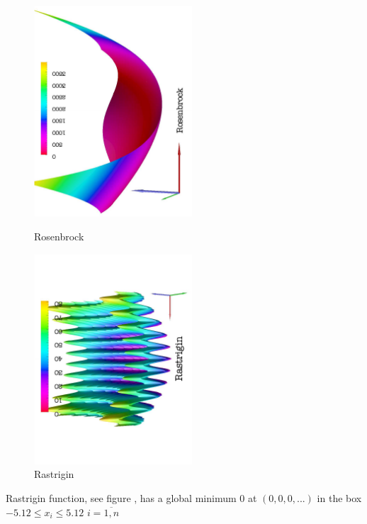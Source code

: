 \begin{figure}[!htb]
\begin{minipage}[!htb]{7.6cm}
\begin{center}
\includegraphics[width=5.9cm,angle=-90]{figures/rosenbrock}
\end{center}
\caption{Rosenbrock  }
\label{rosenbrock}
\end{minipage}
\begin{minipage}[!htb]{7.6cm}
\begin{center}
\includegraphics[width=5.9cm,angle=-90]{figures/rastrigin}
\end{center}
\caption{Rastrigin   }
\label{rastrigin}
\end{minipage}
\end{figure}
\par{Rastrigin function, see figure ,  has a global minimum 0 at $(0,0,0,...)$ in the box
$-5.12\leq x_i \leq 5.12$ $i=\overline{1,n}$}

